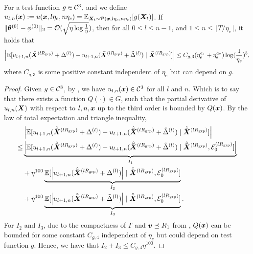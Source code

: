 \begin{lemma}\label{lmm:condition-u-bound}
    For a test function $g\in\mathcal{C}^3$, and we define $u_{l,n}({\bm{x}}):=u({\bm{x}},l\eta_e,n\eta_e)=\mathbb{E}_{{\bm{X}}_t \sim \mathcal{P}({\bm{x}},l\eta_e,n\eta_e)}[g({\bm{X}}_t)]$. If $\|{\bm{\theta}}^{(0)}-\phi^{(0)}\|_2=\mathcal{O}(\sqrt{\eta\log\frac{1}{\eta}})$, then for all $0 \le l \le n-1$, and $1 \le n \le \lfloor T/\eta_e\rfloor$, it holds that
    \begin{align*}
        \left|\mathbb{E}[u_{l+1,n}(\bar{{\bm{X}}}^{(lR_{\mathrm{grp}})}+ \Delta^{(l)})- u_{l+1,n}(\bar{{\bm{X}}}^{(lR_{\mathrm{grp}})}+ \tilde\Delta^{(l)})\mid \bar{{\bm{X}}}^{(lR_{\mathrm{grp}})}]\right| \le C_{g,3}(\eta_e^{a_1}+ \eta_e^{a_2})\log (\frac{1}{\eta_e})^b, 
    \end{align*}
    where $C_{g,3}$ is some positive constant independent of $\eta_e$ but can depend on $g$.
\end{lemma}
\begin{proof}
    Given $g\in\mathcal{C}^3$, by , we have $u_{l,n}({\bm{x}})\in \mathcal{C}^3$ for all $l$ and $n$.  Which is to say that there exists a function $Q(\cdot)\in G$, such that the partial derivative of $u_{l,n}({\bm{X}})$ with respect to $l,n,{\bm{x}}$ up to the third order is bounded by $Q({\bm{x}})$.
    By the law of total expectation and triangle inequality,
    \begin{align*}
        &\left|\mathbb{E}[u_{l+1,n}(\hat{\bar{{\bm{X}}}}^{(lR_{\mathrm{grp}})}+ \Delta^{(l)})- u_{l+1,n}(\hat{\bar{{\bm{X}}}}^{(lR_{\mathrm{grp}})}+ \tilde\Delta^{(l)})\mid \hat{\bar{{\bm{X}}}}^{(lR_{\mathrm{grp}})}]\right| \\
        \le & \underbrace{\left|\mathbb{E}[u_{l+1,n}(\hat{\bar{{\bm{X}}}}^{(lR_{\mathrm{grp}})}+ \Delta^{(l)})- u_{l+1,n}(\hat{\bar{{\bm{X}}}}^{(lR_{\mathrm{grp}})}+ \tilde\Delta^{(l)})\mid \hat{\bar{{\bm{X}}}}^{(lR_{\mathrm{grp}})},\mathcal{E}_0^{(lR_{\mathrm{grp}})}]\right|}_{I_1}\\
        &+\eta^{100}\underbrace{\mathbb{E}[\left|u_{l+1,n}(\hat{\bar{{\bm{X}}}}^{(lR_{\mathrm{grp}})}+ \Delta^{(l)})\right|\mid \hat{\bar{{\bm{X}}}}^{(lR_{\mathrm{grp}})},\mathcal{E}_0^{(lR_{\mathrm{grp}})}]}_{I_2}\\
        &+\eta^{100}\underbrace{\mathbb{E}[\left|u_{l+1,n}(\hat{\bar{{\bm{X}}}}^{(lR_{\mathrm{grp}})}+ \tilde\Delta^{(l)})\right|\mid \hat{\bar{{\bm{X}}}}^{(lR_{\mathrm{grp}})},\mathcal{E}_0^{(lR_{\mathrm{grp}})}]}_{I_3}.
    \end{align*}
    For $I_2$ and $I_3$, due to the compactness of $\Gamma$ and ${\bm{v}} \preceq R_1$ from , $Q({\bm{x}})$ can be bounded for some constant $C_{g,4}$ independent of $\eta_e$ but could depend on test function $g$. Hence, we have that $I_2 + I_3 \le C_{g,4} \eta^{100}$.


\end{proof}
